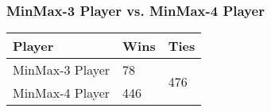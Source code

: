\subsubsection*{MinMax-3 Player vs. MinMax-4 Player}
\begin{table}[h]
	\centering
	\begin{tabular}[h]{l|l|l}
		\textbf{Player} & \textbf{Wins} & \textbf{Ties}\\
		\hline
		MinMax-3 Player & 78 & \multirow{2}{*}{476}	\\
		MinMax-4 Player & 446 &	\\
	\end{tabular}
\end{table}
